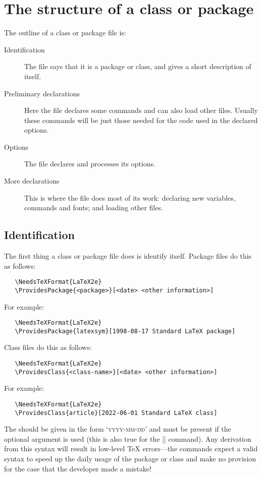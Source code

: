 \documentclass{ltxguide}
\begin{document}
\section{The structure of a class or package}
\label{Sec:structure}

The outline of a class or package file is:
\begin{description}
\item[Identification] The file says that it is a \LaTeXe{} package or
   class, and gives a short description of itself.
\item[Preliminary declarations]
   Here the file declares some commands and can also load
   other files.  Usually these commands will be just those needed for
   the code used in the declared options.
\item[Options] The file declares and processes its options.
\item[More declarations] This is where the file does most of its work:
   declaring new variables, commands and fonts; and loading other files.
\end{description}

\subsection{Identification}

The first thing a class or package file does is identify itself.
Package files do this as follows:
\begin{verbatim}
   \NeedsTeXFormat{LaTeX2e}
   \ProvidesPackage{<package>}[<date> <other information>]
\end{verbatim}
For example:
\begin{verbatim}
   \NeedsTeXFormat{LaTeX2e}
   \ProvidesPackage{latexsym}[1998-08-17 Standard LaTeX package]
\end{verbatim}
Class files do this as follows:
\begin{verbatim}
   \NeedsTeXFormat{LaTeX2e}
   \ProvidesClass{<class-name>}[<date> <other information>]
\end{verbatim}
For example:
\begin{verbatim}
   \NeedsTeXFormat{LaTeX2e}
   \ProvidesClass{article}[2022-06-01 Standard LaTeX class]
\end{verbatim}
The  should be given in the form `\textsc{yyyy-mm-dd}' and must be
present if the optional argument is used (this is also true for the
|\NeedsTeXFormat| command). Any derivation from this syntax will result in
low-level \TeX{} errors---the commands expect a valid syntax to speed up the
daily usage of the package or class and make no provision for the case that the
developer made a mistake!
\end{document}
